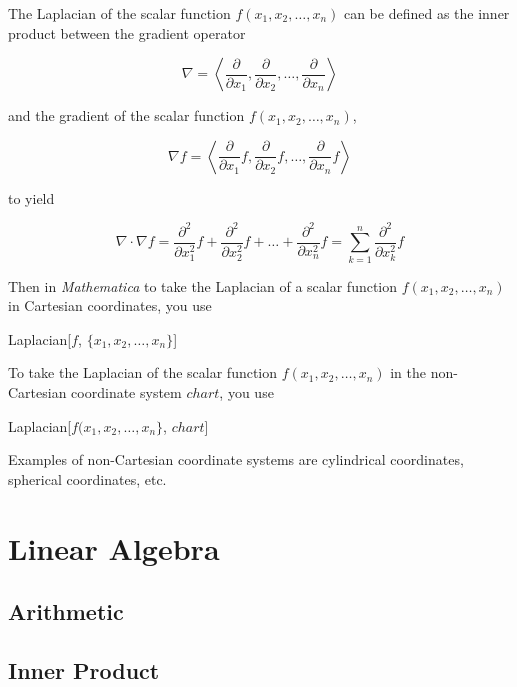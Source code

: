 \documentclass[11pt,letterpaper,twoside,titlepage]{book}
\newcommand{\Mathematica}{\textit{Mathematica} }
\begin{document}
					The Laplacian of the scalar function $ f(x_1, x_2, \ldots, x_n) $ can be defined as the inner product between the gradient operator 
					
					\[ \nabla = \left\langle \frac{\partial}{\partial x_1}, \frac{\partial}{\partial x_2}, \ldots, \frac{\partial}{\partial x_n} \right\rangle \]
					
					and the gradient of the scalar function  $ f(x_1, x_2, \ldots, x_n) $,
					
					\[ \nabla f = \left\langle \frac{\partial}{\partial x_1}f, \frac{\partial}{\partial x_2}f, \ldots, \frac{\partial}{\partial x_n}f \right\rangle \]
					
					to yield
					
					\[ \nabla \cdot \nabla f = \frac{\partial^2}{\partial x_1^2}f + \frac{\partial^2}{\partial x_2^2}f + \dots + \frac{\partial^2}{\partial x_n^2}f = \sum_{k = 1}^n \frac{\partial^2}{\partial x_k^2} f \]
					
					Then in \Mathematica to take the Laplacian of a scalar function $f(x_1, x_2, \ldots, x_n)$ in Cartesian coordinates, you use
					
					\begin{center}
					
						Laplacian[$f$, $\{x_1, x_2, \ldots, x_n \}$]
					
					\end{center}
					
					To take the Laplacian of the scalar function $f(x_1, x_2, \ldots, x_n)$ in the non-Cartesian coordinate system $chart$, you use
					
					\begin{center}
					
						Laplacian[$f(x_1, x_2, \ldots, x_n \}$, $chart$]
					
					\end{center}
					
					Examples of non-Cartesian coordinate systems are cylindrical coordinates, spherical coordinates, etc.
			
		\chapter{Linear Algebra}
		
			\section{Arithmetic}
			
			\section{Inner Product}
			
\end{document}
